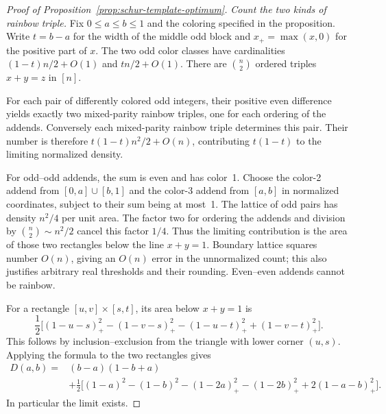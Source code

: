 \begin{proof}[Proof of Proposition~\ref{prop:schur-template-optimum}]
\textit{Count the two kinds of rainbow triple.}
Fix $0\le a\le b\le1$ and the coloring specified in the proposition.
Write $t=b-a$ for the width of the middle odd block and
$x_+=\max(x,0)$ for the positive part of $x$. The two odd color
classes have cardinalities $(1-t)n/2+O(1)$ and $tn/2+O(1)$.
There are $\binom n2$ ordered triples $x+y=z$ in $[n]$.

For each pair of differently colored odd integers, their positive even
difference yields exactly two mixed-parity rainbow triples, one for
each ordering of the addends. Conversely each mixed-parity rainbow
triple determines this pair. Their number is therefore
$t(1-t)n^2/2+O(n)$, contributing $t(1-t)$ to the limiting normalized
density.

For odd--odd addends, the sum is even and has color~1. Choose the
color-2 addend from $[0,a]\cup[b,1]$ and the color-3 addend from $[a,b]$
in normalized coordinates, subject to their sum being at most~1.
The lattice of odd pairs has density $n^2/4$ per unit area.
The factor two for ordering the addends and division by
$\binom n2\sim n^2/2$ cancel this factor $1/4$. Thus the limiting
contribution is the area of those two rectangles below the line
$x+y=1$. Boundary lattice squares number $O(n)$, giving an $O(n)$
error in the unnormalized count; this also justifies arbitrary real
thresholds and their rounding. Even--even addends cannot be rainbow.

For a rectangle $[u,v]\times[s,t]$, its area below $x+y=1$ is
\[
 \frac12\bigl[(1-u-s)_+^2-(1-v-s)_+^2
             -(1-u-t)_+^2+(1-v-t)_+^2\bigr].
\]
This follows by inclusion--exclusion from the triangle with lower
corner $(u,s)$. Applying the formula to the two rectangles gives
\begin{align}
 D(a,b)={}&(b-a)(1-b+a)\nonumber\\
 &+\frac12\bigl[(1-a)^2-(1-b)^2-(1-2a)_+^2
 -(1-2b)_+^2+2(1-a-b)_+^2\bigr].
 \label{eq:schur-template-objective}
\end{align}
In particular the limit exists.


\end{proof}
